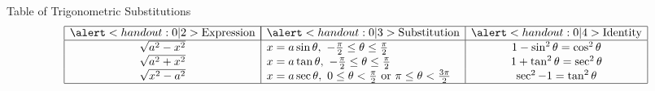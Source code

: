 \begin{frame}
Table of Trigonometric Substitutions
\[
\begin{array}{|c|l|c|}
\hline
\alert<handout:0| 2>{\text{Expression}} & \multicolumn{1}{|c|}{\alert<handout:0| 3>{\text{Substitution}}} & \alert<handout:0| 4>{\text{Identity}}\\
\hline
\sqrt{a^2-x^2} & x = a\sin \theta , \ -\frac{\pi}{2} \leq \theta \leq \frac{\pi}{2} & 1 - \sin^2 \theta = \cos^2 \theta\\
\sqrt{a^2+x^2} & x = a\tan \theta , \ -\frac{\pi}{2} \leq \theta \leq \frac{\pi}{2} & 1 + \tan^2 \theta = \sec^2 \theta\\
\sqrt{x^2-a^2} & x = a\sec \theta , \ 0 \leq \theta < \frac{\pi}{2} \ \textrm{or} \ \pi \leq \theta < \frac{3\pi}{2} & \sec^2 - 1 = \tan^2  \theta\\
\hline
\end{array}
\]
%
\end{frame}
